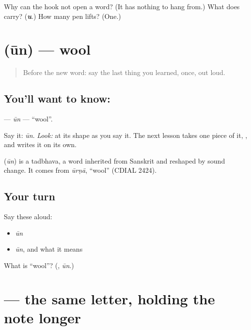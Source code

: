 \begin{tcolorbox}[breakable,colback=teal!4,colframe=teal!35!black,title={Before you move on}]
Why can the hook not open a word? (It has nothing to hang from.) What does \textbf{} carry? (\emph{\textbf{u}}.) How many pen lifts? (One.)
\end{tcolorbox}
\section[\texorpdfstring{\hi{ऊन} (ūn)}{ऊन (ūn)}]{ (ūn) — wool}

\label{lesson:HI-C22-uun}



\begin{quote}
Before the new word: say the last thing you learned, once, out loud.
\end{quote}

\subsection*{You'll want to know: }
\textbf{} — \emph{ūn} — \textquotedblleft{}wool\textquotedblright{}.

Say it: \emph{ūn}. \emph{Look:} at its shape as you say it. The next lesson takes one piece of it, \textbf{}, and writes it on its own.

\begin{cousinweb}
\textbf{} (\emph{ūn}) is a tadbhava, a word inherited from Sanskrit and reshaped by sound change. It comes from \emph{ūrṇā}, \textquotedblleft{}wool\textquotedblright{} (CDIAL 2424).
\end{cousinweb}

\subsection*{Your turn}
Say these aloud:

\begin{itemize}
\raggedright
  \item \emph{ūn}
  \item \emph{ūn}, and what it means
\end{itemize}

\begin{tcolorbox}[breakable,colback=teal!4,colframe=teal!35!black,title={Before you move on}]
What is \textquotedblleft{}wool\textquotedblright{}? (\textbf{}, \emph{ūn}.)
\end{tcolorbox}
\section[\texorpdfstring{\hi{ऊ} (ū)}{ऊ (ū)}]{ — the same letter, holding the note longer}

